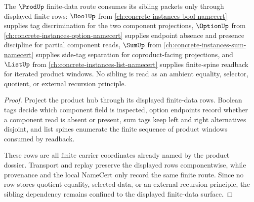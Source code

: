 \begin{lemma}
\label{lem:prod-finite-data-sibling-dependency}
The $\ProdUp$ finite-data route consumes its sibling packets only through displayed finite rows: $\BoolUp$ from \autoref{ch:concrete-instances-bool-namecert} supplies tag discrimination for the two component projections, $\OptionUp$ from \autoref{ch:concrete-instances-option-namecert} supplies endpoint absence and presence discipline for partial component reads, $\SumUp$ from \autoref{ch:concrete-instances-sum-namecert} supplies side-tag separation for coproduct-facing projections, and $\ListUp$ from \autoref{ch:concrete-instances-list-namecert} supplies finite-spine readback for iterated product windows. No sibling is read as an ambient equality, selector, quotient, or external recursion principle.
\end{lemma}
\begin{proof}
Project the product hub through its displayed finite-data rows. Boolean tags decide which component field is inspected, option endpoints record whether a component read is absent or present, sum tags keep left and right alternatives disjoint, and list spines enumerate the finite sequence of product windows consumed by readback.

These rows are all finite carrier coordinates already named by the product dossier. Transport and replay preserve the displayed rows componentwise, while provenance and the local NameCert only record the same finite route. Since no row stores quotient equality, selected data, or an external recursion principle, the sibling dependency remains confined to the displayed finite-data surface.
\end{proof}
